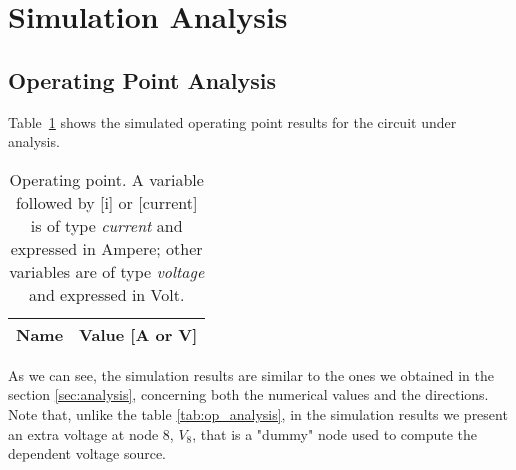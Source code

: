 \section{Simulation Analysis}
\label{sec:simulation}

\subsection{Operating Point Analysis}

\par Table~\ref{tab:op_sim} shows the simulated operating point results for the circuit
under analysis.
\begin{table}[H]
  \centering
  \begin{tabular}{|l|r|}
    \hline    
    {\bf Name} & {\bf Value [A or V]} \\ \hline
    
  \end{tabular}
  \caption{Operating point. A variable followed by [i] or [current] is of type {\em current}
    and expressed in Ampere; other variables are of type {\it voltage} and expressed in
    Volt.}
  \label{tab:op_sim}
\end{table}

\par  As we can see, the simulation results are similar to the ones we obtained in the section \ref{sec:analysis}, concerning both the numerical values and the directions. Note that, unlike the table \ref{tab:op_analysis}, in the simulation results we present an extra voltage at node 8, $V_8$, that is a "dummy" node used to compute the dependent voltage source.

\newpage
